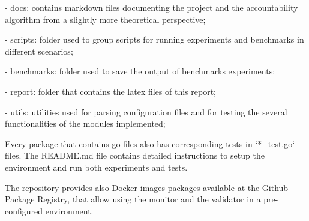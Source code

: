 \documentclass[a4paper,11pt,oneside]{report}
\begin{document}
\begin{markdown}
- docs: contains markdown files documenting the project and the accountability algorithm from a slightly more theoretical perspective; 

- scripts: folder used to group scripts for running experiments and benchmarks in different scenarios;

- benchmarks: folder used to save the output of benchmarks experiments;

- report: folder that contains the latex files of this report;

- utils: utilities used for parsing configuration files and for testing the several functionalities of the modules implemented;

Every package that contains go files also has corresponding tests in `*_test.go` files. The README.md file contains detailed instructions to setup the environment and run both experiments and tests.

The repository provides also Docker images packages available at the Github Package Registry, that allow using the monitor and the validator in a pre-configured environment. 

\end{markdown}
\end{document}
